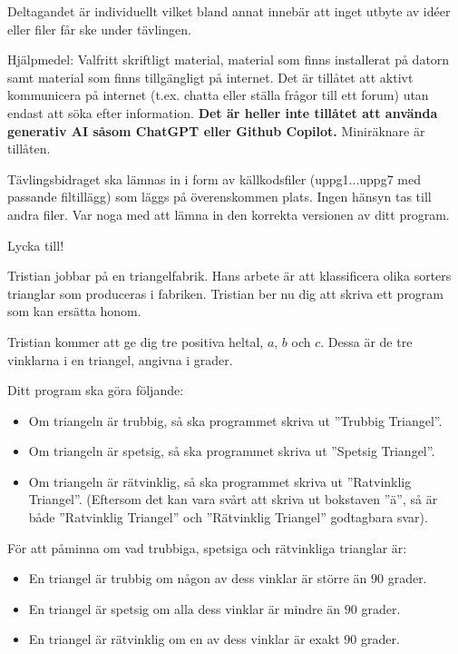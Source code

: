 \begin{lista}
\item Deltagandet är individuellt vilket bland annat innebär att inget utbyte av idéer eller 
filer får ske under tävlingen.  
\item Hjälpmedel: Valfritt skriftligt material, material som finns installerat på datorn samt material som finns tillgängligt på internet.
Det är  tillåtet att aktivt kommunicera på internet (t.ex. chatta eller ställa frågor till ett forum) utan endast att söka efter information.
{\bf Det är heller inte tillåtet att använda generativ AI såsom ChatGPT eller Github Copilot.}
Miniräknare är tillåten.
\item Tävlingsbidraget ska lämnas in i form av källkodsfiler (uppg1...uppg7 med passande filtillägg) som läggs på överenskommen plats. Ingen hänsyn tas till andra filer. Var noga 
med att lämna in den korrekta versionen av ditt program.  
\end{lista}

\begin{center}
\Large Lycka till!
\end{center}
%

\newpage
{}

Tristian jobbar på en triangelfabrik.
Hans arbete är att klassificera olika sorters trianglar som produceras i fabriken.
Tristian ber nu dig att skriva ett program som kan ersätta honom.

Tristian kommer att ge dig tre positiva heltal, $a$, $b$ och $c$. 
Dessa är de tre vinklarna i en triangel, angivna i grader.

Ditt program ska göra följande:
\begin{itemize}
  \item Om triangeln är trubbig, så ska programmet skriva ut ”Trubbig Triangel”.
  \item Om triangeln är spetsig, så ska programmet skriva ut ”Spetsig Triangel”.
  \item Om triangeln är rätvinklig, så ska programmet skriva ut ”Ratvinklig Triangel”.
  (Eftersom det kan vara svårt att skriva ut bokstaven ”ä”, så är både ”Ratvinklig Triangel” och ”Rätvinklig Triangel” godtagbara svar).
\end{itemize}

För att påminna om vad trubbiga, spetsiga och rätvinkliga trianglar är:
\begin{itemize}
  \item En triangel är trubbig om någon av dess vinklar är större än $90$ grader.
  \item En triangel är spetsig om alla dess vinklar är mindre än $90$ grader.
  \item En triangel är rätvinklig om en av dess vinklar är exakt $90$ grader.
\end{itemize}

